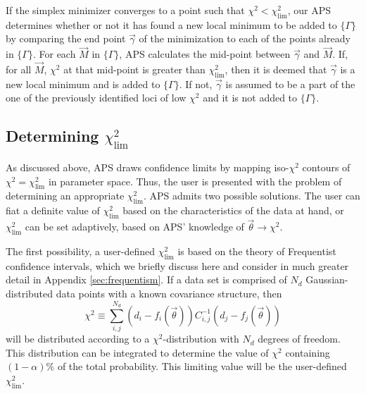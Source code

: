 \documentclass[useAMS,usenatbib]{aastex}
\begin{document}
If the simplex minimizer converges to a point such that
$\chi^2<\chi^2_\text{lim}$, our APS determines whether or not it
has found a new local minimum to be added to $\{\Gamma\}$ by comparing the end
point $\vec{\gamma}$ of the minimization to each of the points already in
$\{\Gamma\}$.  For each $\vec{M}$ in $\{\Gamma\}$, APS calculates the mid-point
between $\vec{\gamma}$ and $\vec{M}$.  If, for all $\vec{M}$, 
$\chi^2$ at that mid-point is greater
than $\chi^2_\text{lim}$, then it is deemed that $\vec{\gamma}$ is a new local
minimum and is added to $\{\Gamma\}$.  If not, $\vec{\gamma}$ is assumed to be a
part of the one of the previously identified loci of low $\chi^2$ and it is not
added to $\{\Gamma\}$.

\subsection{Determining $\chi^2_\text{lim}$}
\label{sec:chi}

As discussed above, APS draws confidence limits by mapping
iso-$\chi^2$ contours of $\chi^2=\chi^2_\text{lim}$ in parameter space.
Thus, the user is presented with the problem of determining an
appropriate $\chi^2_\text{lim}$.  APS admits two possible solutions.
The user can fiat a definite value of $\chi^2_\text{lim}$
based on the characteristics of the data at hand,
or $\chi^2_\text{lim}$ can be set adaptively, based on APS'
knowledge of $\vec{\theta}\rightarrow\chi^2$.

The first possibility, a user-defined $\chi^2_\text{lim}$ is based
on the theory of Frequentist confidence intervals, which we briefly discuss
here and consider in much greater detail in Appendix \ref{sec:frequentism}.
If a data set is comprised of $N_d$ Gaussian-distributed data points
with a known covariance structure, then 
\begin{equation}
\chi^2\equiv\sum_{i,j}^{N_d}(d_i-f_i(\vec{\theta}))C^{-1}_{i,j}
(d_j-f_j(\vec{\theta}))
\end{equation}
will be distributed according to a $\chi^2$-distribution with $N_d$ degrees
of freedom.  This distribution can be integrated to determine the value
of $\chi^2$ containing $(1-\alpha)\%$ of the total probability.  This limiting
value will be the user-defined $\chi^2_\text{lim}$.
\end{document}
